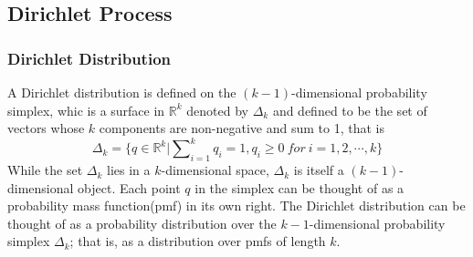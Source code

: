 \subsection{Dirichlet Process}
\subsubsection{Dirichlet Distribution}
A Dirichlet distribution is defined on the $\mathit{(k-1)}$-dimensional probability simplex, whic is a surface in $\mathbb{R}^k$ denoted by $\Delta_k
$ and defined to be the set of vectors whose $k$ components are non-negative and sum to 1, that is
\begin{equation}
	\Delta_k=\{q\in \mathbb{R}^k|\sum\nolimits_{i=1}^{k}q_i=1,q_i\geq 0\ for\ i=1,2,\cdots,k\}
\end{equation}
While the set $\Delta_k$ lies in a $k$-dimensional space, $\Delta_k$ is itself a $(k-1)$-dimensional object. Each point $q$ in the simplex can be thought of as a probability mass function(pmf) in its own right. The Dirichlet distribution can be thought of as a probability distribution over the $k-1$-dimensional probability simplex $\Delta_k$; that is, as a distribution over pmfs of length $k$.


